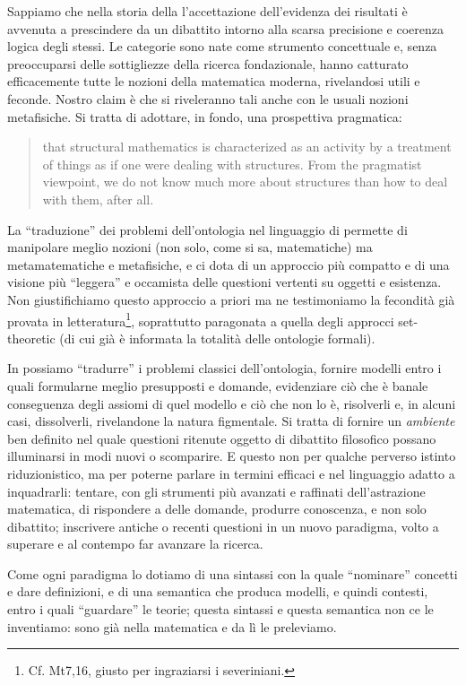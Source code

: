 Sappiamo che nella storia della \CT l'accettazione dell'evidenza dei risultati è avvenuta a prescindere da un dibattito intorno alla scarsa precisione e coerenza logica degli stessi. Le categorie sono nate come strumento concettuale e, senza preoccuparsi delle sottigliezze della ricerca fondazionale, hanno catturato efficacemente tutte le nozioni della matematica moderna, rivelandosi utili e feconde. Nostro claim è che si riveleranno tali anche con le usuali nozioni metafisiche. Si tratta di adottare, in fondo, una prospettiva pragmatica:
\begin{quote}
	that structural mathematics is characterized as an activity by a treatment of things as if one were dealing with structures. From the pragmatist viewpoint, we do not know much more about structures than how to deal with them, after all. \hfill \cite{kromer2007tool}
\end{quote}
La ``traduzione'' dei problemi dell'ontologia nel linguaggio di \CT permette di manipolare meglio nozioni (non solo, come si sa, matematiche) ma metamatematiche e metafisiche, e ci dota di un approccio più compatto e di una visione più ``leggera'' e occamista delle questioni vertenti su oggetti e esistenza. Non giustifichiamo questo approccio a priori ma ne testimoniamo la fecondità già provata in letteratura\footnote{Cf. Mt7,16, giusto per ingraziarsi i severiniani.}, soprattutto paragonata a quella degli approcci set-theoretic (di cui già è informata la totalità delle ontologie formali).

In \CT possiamo ``tradurre'' i problemi classici dell'ontologia, fornire modelli entro i quali formularne meglio presupposti e domande, evidenziare ciò che è banale conseguenza degli assiomi di quel modello e ciò che non lo è, risolverli e, in alcuni casi, dissolverli, rivelandone la natura figmentale. Si tratta di fornire un \emph{ambiente} ben definito nel quale questioni ritenute oggetto di dibattito filosofico possano illuminarsi in modi nuovi o scomparire. E questo non per qualche perverso istinto riduzionistico, ma per poterne parlare in termini efficaci e nel linguaggio adatto a inquadrarli: tentare, con gli strumenti più avanzati e raffinati dell'astrazione matematica, di rispondere a delle domande, produrre conoscenza, e non solo dibattito; inscrivere antiche o recenti questioni in un nuovo paradigma, volto a superare e al contempo far avanzare la ricerca.

Come ogni paradigma lo dotiamo di una sintassi con la quale ``nominare'' concetti e dare definizioni, e di una semantica che produca modelli, e quindi contesti, entro i quali ``guardare'' le teorie; questa sintassi e questa semantica non ce le inventiamo: sono già nella matematica e da lì le preleviamo.
